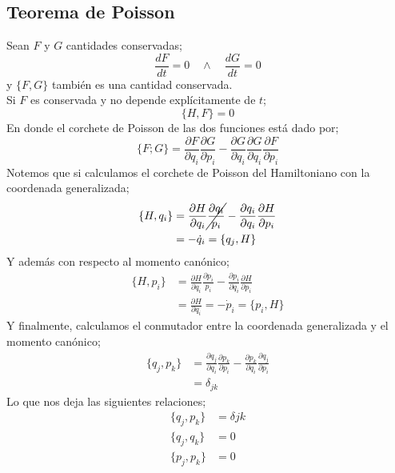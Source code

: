 \documentclass[../main.tex]{subfiles}
\begin{document}
 \subsection{Teorema de Poisson}
 Sean $F$ y $G$ cantidades conservadas;
 \begin{equation}
   \frac{dF}{dt} = 0 \quad \wedge \quad \frac{dG}{dt} = 0
  \end{equation}
   y $\{F,G\}$ también es una cantidad conservada. \\
   Si $F$ es conservada y no depende explícitamente de $t$;
   \begin{equation}
     \{H,F\} = 0
    \end{equation}
    En donde el corchete de Poisson de las dos funciones está dado por;
    \begin{equation}
      \{F;G\} = \frac{\partial F}{\partial q_i}\frac{\partial G}{\partial p_i} - \frac{\partial G}{\partial q_i} \frac{\partial G}{\partial q_i}\frac{\partial F}{\partial p_i}
     \end{equation}
     Notemos que si calculamos el corchete de Poisson del Hamiltoniano con la coordenada generalizada;
     \begin{align*}
       \{H,q_i\} & = \frac{\partial H}{\partial q_i} \cancel{\frac{\partial q_i}{p_i}} - \frac{\partial q_i}{\partial q_i} \frac{\partial H}{\partial p_i} \\
        & = -\dot{q}_i = \{q_j,H\}
     \end{align*}
     Y además con respecto al momento canónico;
     \begin{align*}
       \{H,p_i\} & = \frac{\partial H}{\partial q_i} \frac{\partial p_i}{p_i} - \frac{\partial p_i}{\partial q_i} \frac{\partial H}{\partial p_i} \\
       & = \frac{\partial H}{\partial q_i} = -\dot{p}_i = \{p_i,H\}
     \end{align*}
  Y finalmente, calculamos el conmutador entre la coordenada generalizada y el momento canónico;
  \begin{align*}
    \{q_j,p_k\} & = \frac{\partial q_j}{\partial q_i} \frac{\partial p_k}{\partial p_i} - \frac{\partial p_k}{\partial q_i} \frac{\partial q_j}{\partial p_i}  \\
     & = \delta_{jk}
  \end{align*}
  Lo que nos deja las siguientes relaciones;
  \begin{align}
    \{q_j,p_k\} & = \delta{jk} \\
    \{q_j,q_k\} & = 0\\
    \{p_j,p_k\} & = 0 
  \end{align} 
\end{document}

